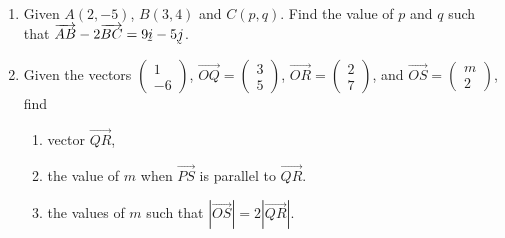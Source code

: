 \documentclass{report}
\renewcommand{\vec}[1]{\underaccent{\tilde}{#1}}
\begin{document}
\begin{multicols*}{2}
\begin{enumerate}
        \item Given $A(2, -5)$, $B(3, 4)$ and $C(p, q)$. Find the value of $p$ and $q$ such
              that $\overrightarrow{AB} - 2\overrightarrow{BC} = 9\vec{i} - 5\vec{j}$.

        \item Given the vectors $\begin{pmatrix}
                      1 \\-6
                  \end{pmatrix}$, $\overrightarrow{OQ} = \begin{pmatrix}
                      3 \\5
                  \end{pmatrix}$, $\overrightarrow{OR} = \begin{pmatrix}
                      2 \\7
                  \end{pmatrix}$, and $\overrightarrow{OS} = \begin{pmatrix}
                      m \\2
                  \end{pmatrix}$, find
              \begin{enumerate}
                  \item vector $\overrightarrow{QR}$,
                  \item the value of $m$ when $\overrightarrow{PS}$ is parallel to
                        $\overrightarrow{QR}$.
                  \item the values of $m$ such that $|\overrightarrow{OS}| = 2|\overrightarrow{QR}|$.
              \end{enumerate}
    \end{enumerate}

\end{multicols*}
\end{document}

